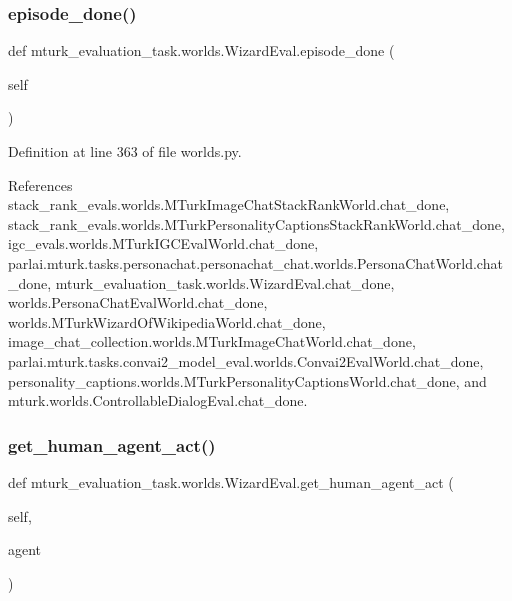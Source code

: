 \subsubsection{\texorpdfstring{episode\+\_\+done()}{episode\_done()}}
{\footnotesize\ttfamily def mturk\+\_\+evaluation\+\_\+task.\+worlds.\+Wizard\+Eval.\+episode\+\_\+done (\begin{DoxyParamCaption}\item[{}]{self }\end{DoxyParamCaption})}



Definition at line 363 of file worlds.\+py.



References stack\+\_\+rank\+\_\+evals.\+worlds.\+M\+Turk\+Image\+Chat\+Stack\+Rank\+World.\+chat\+\_\+done, stack\+\_\+rank\+\_\+evals.\+worlds.\+M\+Turk\+Personality\+Captions\+Stack\+Rank\+World.\+chat\+\_\+done, igc\+\_\+evals.\+worlds.\+M\+Turk\+I\+G\+C\+Eval\+World.\+chat\+\_\+done, parlai.\+mturk.\+tasks.\+personachat.\+personachat\+\_\+chat.\+worlds.\+Persona\+Chat\+World.\+chat\+\_\+done, mturk\+\_\+evaluation\+\_\+task.\+worlds.\+Wizard\+Eval.\+chat\+\_\+done, worlds.\+Persona\+Chat\+Eval\+World.\+chat\+\_\+done, worlds.\+M\+Turk\+Wizard\+Of\+Wikipedia\+World.\+chat\+\_\+done, image\+\_\+chat\+\_\+collection.\+worlds.\+M\+Turk\+Image\+Chat\+World.\+chat\+\_\+done, parlai.\+mturk.\+tasks.\+convai2\+\_\+model\+\_\+eval.\+worlds.\+Convai2\+Eval\+World.\+chat\+\_\+done, personality\+\_\+captions.\+worlds.\+M\+Turk\+Personality\+Captions\+World.\+chat\+\_\+done, and mturk.\+worlds.\+Controllable\+Dialog\+Eval.\+chat\+\_\+done.

\mbox{\label{classmturk__evaluation__task_1_1worlds_1_1WizardEval_a8d951acf0577bb2cfbfe77f49c9147da}} 
\subsubsection{\texorpdfstring{get\+\_\+human\+\_\+agent\+\_\+act()}{get\_human\_agent\_act()}}
{\footnotesize\ttfamily def mturk\+\_\+evaluation\+\_\+task.\+worlds.\+Wizard\+Eval.\+get\+\_\+human\+\_\+agent\+\_\+act (\begin{DoxyParamCaption}\item[{}]{self,  }\item[{}]{agent }\end{DoxyParamCaption})}



